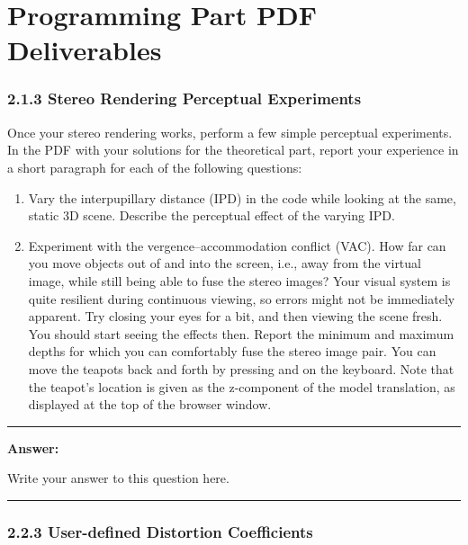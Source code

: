 \documentclass[conference]{styles/acmsiggraph}
\newenvironment{answer}{}{}
\newcommand{\points}[1]{\hfill \normalfont{(\textit{#1pts})}}
\newcommand{\pointsin}[1]{\normalfont{(\textit{#1pts})}}
\begin{document}
\newpage
\section{Programming Part PDF Deliverables}
\subsubsection*{2.1.3 Stereo Rendering Perceptual Experiments \points{10}}
Once your stereo rendering works, perform a few simple perceptual experiments. In the PDF with your solutions for the theoretical part, report your experience in a short paragraph for each of the following questions:

\begin{enumerate}[label=(\roman*)]
\item Vary the interpupillary distance (IPD) in the code while looking at the same, static 3D scene. Describe the perceptual effect of the varying IPD. \pointsin{5}

\item Experiment with the vergence--accommodation conflict (VAC). How far can you move objects out of and into the screen, i.e., away from the virtual image, while still being able to fuse the stereo images? Your visual system is quite resilient during continuous viewing, so errors might not be immediately apparent. Try closing your eyes for a bit, and then viewing the scene fresh. You should start seeing the effects then. Report the minimum and maximum depths for which you can comfortably fuse the stereo image pair. You can move the teapots back and forth by pressing  and  on the keyboard. Note that the teapot's location is given as the z-component of the model translation, as displayed at the top of the browser window. \pointsin{5}

\end{enumerate}

\begin{answer}
\rule{\textwidth}{0.4pt}
	
	\textbf{Answer:}
	
	Write your answer to this question here.

\rule{\textwidth}{0.4pt}
\end{answer}

\subsubsection*{2.2.3 User-defined Distortion Coefficients \points{10}}
\end{document}
